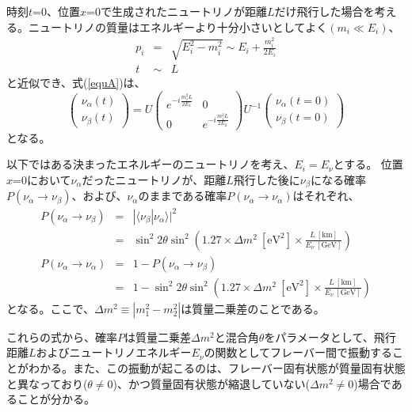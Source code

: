 \documentclass[11pt]{jreport}
\newcommand{\bra}[1]{\langle #1 |}
\newcommand{\equref}[1]{式(\ref{#1})}
\begin{document}
時刻$t$=0、位置$x$=0で生成されたニュートリノが距離$L$だけ飛行した場合を考える。ニュートリノの質量はエネルギーより十分小さいとしてよく$(m_{i}\ll E_{i})$、
\begin{eqnarray}
p_{i} & = & \sqrt{E_{i}^{2}-m_{i}^{2}} \sim E_{i} + \frac{m_{i}^{2}}{2E_{i}}\\
t & \sim & L
\end{eqnarray}
と近似でき、\equref{equA}は、
\begin{equation}
\begin{pmatrix}
\nu_{\alpha}(t)\\
\nu_{\beta}(t)
\end{pmatrix}
=U
\begin{pmatrix}
e^{-i\frac{m_{1}^{2}L}{2E_{1}}} & 0\\
0 & e^{-i\frac{m_{1}^{2}L}{2E_{2}}}
\end{pmatrix}
U^{-1}
\begin{pmatrix}
\nu_{\alpha}(t=0)\\
\nu_{\beta}(t=0)
\end{pmatrix}
\end{equation}
となる。

以下ではある決まったエネルギーのニュートリノを考え、$E_{i}=E_{\nu}$とする。
位置$x$=0において$\nu_{\alpha}$だったニュートリノが、距離$L$飛行した後に$\nu_{\beta}$になる確率$P(\nu_{\alpha}\rightarrow \nu_{\beta})$、および、$\nu_{\alpha}$のままである確率$P(\nu_{\alpha}\rightarrow \nu_{\alpha})$はそれぞれ、
\begin{eqnarray}
P(\nu_{\alpha}\rightarrow \nu_{\beta}) & = & |\bra{\nu_{\beta}}\nu_{\alpha}\rangle|^{2} \nonumber\\
& = & \sin^{2}2\theta\sin^{2}\left(1.27\times \Delta m^{2}\ \mathrm{[eV^{2}]}\times \frac{L\ \mathrm{[km]}}{E_{\nu}\ \mathrm{[GeV]}}\right) \label{nuchange}\\
P(\nu_{\alpha}\rightarrow \nu_{\alpha}) & = & 1 - P(\nu_{\alpha}\rightarrow \nu_{\beta}) \nonumber \\
& = & 1 - \sin^{2}2\theta\sin^{2}\left(1.27 \times \Delta m^{2}\ \mathrm{[eV^{2}]} \times \frac{L\ \mathrm{[km]}}{E_{\nu}\ \mathrm{[GeV]}}\right) \label{nuunchange}
\end{eqnarray}
となる。ここで、$\Delta m^{2}\equiv |m_{1}^{2} - m_{2}^{2}|$は質量二乗差のことである。

これらの式から、確率$P$は質量二乗差$\Delta m^{2}$と混合角$\theta$をパラメータとして、飛行距離$L$およびニュートリノエネルギー$E_{\nu}$の関数としてフレーバー間で振動することがわかる。また、この振動が起こるのは、フレーバー固有状態が質量固有状態と異なっており($\theta \neq 0$)、かつ質量固有状態が縮退していない($\Delta m^{2} \neq 0$)場合であることが分かる。
\end{document}
